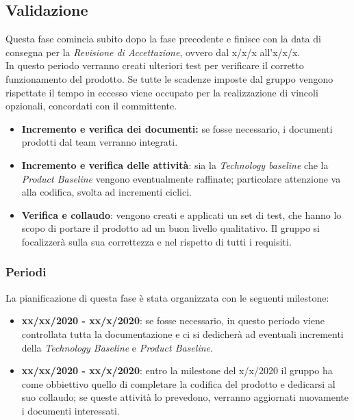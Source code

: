 \subsection{Validazione}
Questa fase comincia subito dopo la fase precedente e finisce con la data di consegna per la \textit{Revisione di Accettazione}, ovvero dal x/x/x all'x/x/x.\\
In questo periodo verranno creati ulteriori test per verificare il corretto funzionamento del prodotto. Se tutte le scadenze imposte dal gruppo vengono rispettate il tempo in eccesso viene occupato per la realizzazione di vincoli opzionali, concordati con il committente. 

\begin{itemize}
\item \textbf{Incremento e verifica dei documenti:} se fosse necessario, i documenti prodotti dal team verranno integrati.

 \item \textbf{Incremento e verifica delle attività}: sia la \textit{Technology baseline} che la \textit{Product Baseline} vengono eventualmente raffinate; particolare attenzione va alla codifica, svolta ad incrementi ciclici.

 \item \textbf{Verifica e collaudo}: vengono creati e applicati un set di test, che hanno lo scopo di portare il prodotto ad un buon livello qualitativo. Il gruppo si focalizzerà sulla sua correttezza e nel rispetto di tutti i requisiti.
\end{itemize}

\subsubsection{Periodi}
La pianificazione di questa fase è stata organizzata con le seguenti milestone:

\begin{itemize}
\item \textbf{xx/xx/2020 - xx/x/2020}: se fosse necessario, in questo periodo viene controllata tutta la documentazione e ci si dedicherà ad eventuali incrementi della \textit{Technology Baseline} e \textit{Product Baseline}.

\item \textbf{xx/xx/2020 - xx/x/2020}: entro la milestone del x/x/2020 il gruppo ha come obbiettivo quello di completare la codifica del prodotto e dedicarsi al suo collaudo; se queste attività lo prevedono, verranno aggiornati nuovamente i documenti interessati.

\end{itemize}
